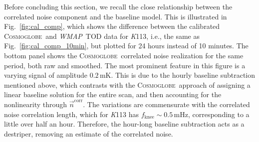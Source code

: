\documentclass[twocolumn]{../../common/aa}
\def\WMAP{\emph{WMAP}}
\def\Planck{\emph{Planck}}
\newcommand{\n}[0]{\vec{n}}
\newcommand{\cosmoglobe}{\textsc{Cosmoglobe}}
\newcommand{\K}[0]{\textit K}
\newcommand{\Ka}[0]{\textit{Ka}}
\begin{document}
Before concluding this section, we recall the close relationship between the correlated noise component and the baseline model. This is illustrated in Fig.~\ref{fig:cal_comp}, which shows the difference between the calibrated \cosmoglobe\ and \WMAP\ TOD data for \K113, i.e., the same as Fig.~\ref{fig:cal_comp_10min}, but plotted for 24 hours instead of 10 minutes. The bottom panel shows the \cosmoglobe\ correlated noise realization for the same period, both raw and smoothed. The most prominent feature in this figure is a varying signal of amplitude $0.2\,\mathrm{mK}$. This is due to the hourly baseline subtraction mentioned above, which contrasts with the \cosmoglobe\ approach of assigning a linear baseline solution for the entire scan, and then accounting for the nonlinearity through $\n^{\mathrm{corr}}$. The variations are commensurate with the correlated noise correlation length, which for \K113 has ${f_\mathrm{knee}\sim0.5\,\mathrm{mHz}}$, corresponding to a little over half an hour. Therefore, the hour-long baseline subtraction acts as a destriper, removing an estimate of the correlated noise. 










%






\end{document}
